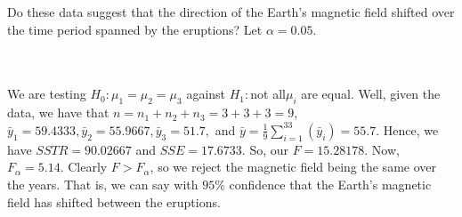 Do these data suggest that the direction of the Earth's magnetic field shifted over the time period
spanned by the eruptions? Let $\alpha=0.05$.\\\\

\begin{solution}\renewcommand{\qedsymbol}{}\ \\
    We are testing $H_0:\mu_1=\mu_2=\mu_3$ against $H_1:$not all$\mu_i$ are equal. Well, given the data,
    we have that $n=n_1+n_2+n_3=3+3+3=9$, $\bar{y}_1=59.4333, \bar{y}_2=55.9667, \bar{y}_3=51.7,$ and
    $\bar{y}=\frac19\sum_{i=1}^33(\bar{y}_i)=55.7$. Hence, we have $SSTR=90.02667$ and $SSE=17.6733$.
    So, our $F=15.28178$. Now, $F_{\alpha}=5.14$. Clearly $F>F_{\alpha}$, so we reject the magnetic
    field being the same over the years. That is, we can say with $95\%$ confidence that the Earth's
    magnetic field has shifted between the eruptions.

\end{solution}